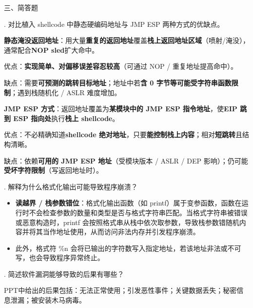 \documentclass[UTF8]{ctexart}
\begin{document}
\noindent
三、简答题

. 对比植入 shellcode 中静态硬编码地址与 JMP ESP 两种方式的优缺点。

\begin{tcolorbox}[title=答题区, height=6.5cm]
\end{tcolorbox}

\textbf{静态淹没返回地址}：用大量\textbf{重复的返回地址}覆盖\textbf{栈上返回地址区域}（喷射/淹没），通常配合\textbf{NOP sled}扩大命中。

优点：\textbf{实现简单、对偏移误差容忍较高}（可通过 NOP / 重复地址提高命中）。

缺点：需要\textbf{可预测的跳转目标地址}；地址中若\textbf{含 0 字节等可能受字符串函数限制}；遇到栈随机化 / ASLR 难度增加。

\textbf{JMP ESP 方式}：返回地址覆盖为\textbf{某模块中的 JMP ESP 指令地址}，使\textbf{EIP 跳到 ESP 指向处}执行\textbf{栈上 shellcode}。

优点：不必精确知道\textbf{shellcode 绝对地址}，只要\textbf{能控制栈上内容}；相对\textbf{短跳转}且结构清晰。

缺点：依赖\textbf{可用的 JMP ESP 地址}（受模块版本 / ASLR / DEP 影响）；仍可能\textbf{受坏字符限制}（写返回地址时）。


. 解释为什么格式化输出可能导致程序崩溃？

\begin{tcolorbox}[title=答题区, height=4cm]
\end{tcolorbox}

\begin{itemize}
  \item \textbf{读越界 / 栈参数错位}：格式化输出函数（如 printf）属于变参函数，函数在运行时不会检查参数的数量和类型是否与格式字符串匹配。当格式字符串被错误或恶意构造时，printf 会按照格式串从栈中依次取参数，导致栈参数错随机内容并将其当作地址使用，从而访问非法内存并引发程序崩溃。
  \item 此外，格式符 \%n 会将已输出的字符数写入指定地址，若该地址非法或不可写，也会导致程序异常终止。
\end{itemize}



. 简述软件漏洞能够导致的后果有哪些？

\begin{tcolorbox}[title=答题区, height=3.5cm]
\end{tcolorbox}

PPT中给出的后果包括：无法正常使用；引发恶性事件；关键数据丢失；秘密信息泄漏；被安装木马病毒。
\end{document}
